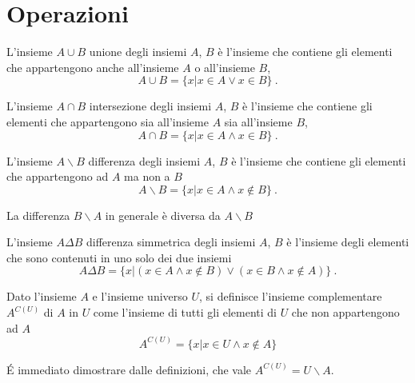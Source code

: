 \section{Operazioni}
\begin{definition}[Unione] L'insieme $A \cup B$ unione degli insiemi $A$, $B$ è l'insieme che contiene gli elementi che appartengono anche all'insieme $A$ o all'insieme $B$,
    \begin{equation}
        A \cup B = \{ x | x \in A \lor x \in B \} \ .
    \end{equation}
\end{definition}

\begin{definition}[Intersezione] L'insieme $A \cap B$ intersezione degli insiemi $A$, $B$ è l'insieme che contiene gli elementi che appartengono sia all'insieme $A$ sia all'insieme $B$,
    \begin{equation}
        A \cap B = \{ x | x \in A \land x \in B \} \ .
    \end{equation}
\end{definition}

\begin{definition}[Differenza] L'insieme $A \backslash B$ differenza degli insiemi $A$, $B$ è l'insieme che contiene gli elementi che appartengono ad $A$ ma non a $B$
    \begin{equation}
        A \backslash B = \{ x | x \in A \land x \notin B \} \ .
    \end{equation}
\end{definition}
La differenza $B \backslash A$ in generale è diversa da $A \backslash B$

\begin{definition} L'insieme $A \Delta B$ differenza simmetrica degli insiemi $A$, $B$ è l'insieme degli elementi che sono contenuti in uno solo dei due insiemi
    \begin{equation}
        A \Delta B = \{ x | ( x \in A \land x \notin B ) \lor ( x \in B \land x \notin A ) \} \ .
    \end{equation}
\end{definition}

\begin{definition} Dato l'insieme $A$ e l'insieme universo $U$, si definisce l'insieme complementare $A^{C(U)}$ di $A$ in $U$ come l'insieme di tutti gli elementi di $U$ che non appartengono ad $A$
    \begin{equation}
        A^{C(U)} = \{ x | x \in U \land x \notin A \}
    \end{equation}
\end{definition}
\'E immediato dimostrare dalle definizioni, che vale $A^{C(U)} = U \backslash A$.



